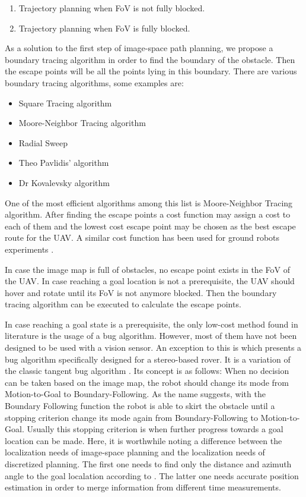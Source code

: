 \begin{enumerate}
	\item Trajectory planning when \ac{FoV} is not fully blocked.
	\item Trajectory planning when \ac{FoV} is fully blocked.
\end{enumerate} 

As a solution to the first step of image-space path planning, we propose a boundary tracing algorithm in order to find the boundary of the obstacle. Then the escape points will be all the points lying in this boundary. There are various boundary tracing algorithms, some examples are:

\begin{itemize}
    \item Square Tracing algorithm
    \item Moore-Neighbor Tracing algorithm
    \item Radial Sweep
    \item Theo Pavlidis’ algorithm
    \item Dr Kovalevsky algorithm
\end{itemize}{}

One of the most efficient algorithms among this list is Moore-Neighbor Tracing algorithm. After finding the escape points a cost function may assign a cost to each of them and the lowest cost escape point may be chosen as the best escape route for the UAV. A similar cost function has been used for ground robots experiments \cite{Ulrich1998} \cite{Borenstein1991} \cite{NALPANTIDIS2011a}. 

In case the image map is full of obstacles, no escape point exists in the \ac{FoV} of the \ac{UAV}. In case reaching a goal location is not a prerequisite, the \ac{UAV} should hover and rotate until its \ac{FoV} is not anymore blocked. Then the boundary tracing algorithm can be executed to calculate the escape points. 

In case reaching a goal state is a prerequisite, the only low-cost method found in literature is the usage of a bug algorithm. However, most of them have not been designed to be used with a vision sensor. An exception to this is \cite{laubach1999autonomous} which presents a bug algorithm specifically designed for a stereo-based rover. It is a variation of the classic tangent bug algorithm \cite{kamon1996new}. Its concept is as follows: When no decision can be taken based on the image map, the robot should change its mode from Motion-to-Goal to Boundary-Following. As the name suggests, with the Boundary Following function the robot is able to skirt the obstacle until a stopping criterion change its mode again from Boundary-Following to Motion-to-Goal. Usually this stopping criterion is when further progress towards a goal location can be made. Here, it is worthwhile noting a difference between the localization needs of image-space planning and the localization needs of discretized planning. The first one needs to find only the distance and azimuth angle to the goal localation according to \cite{mcguire2019comparative}. The latter one needs accurate position estimation in order to merge information from different time measurements. 

